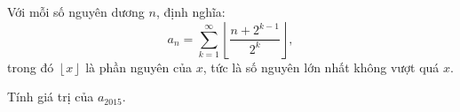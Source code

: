 \ifshowproblem
\begin{problem}\label{example:TWN-2015-TST3-Q3-P1}
    Với mỗi số nguyên dương \( n \), định nghĩa:
    \[
        a_n = \sum_{k=1}^{\infty} \left\lfloor \frac{n + 2^{k-1}}{2^k} \right\rfloor,
    \]
    trong đó \( \left\lfloor x \right\rfloor \) là phần nguyên của \( x \), tức là số nguyên lớn nhất không vượt quá \( x \).
    
    Tính giá trị của \( a_{2015} \).
\end{problem}
\fi

\footnotemark
{}
\fi